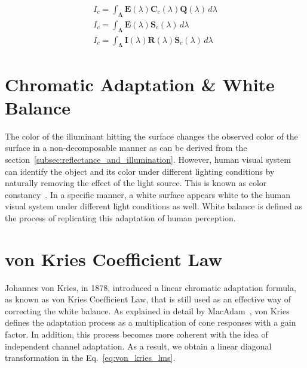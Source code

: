 \begin{subequations}
\label{eq:camera_model_formula}
\begin{align}
I_c = \int_{\mathbf{\Lambda}} \mathbf{E}(\lambda) \mathbf{C}_c(\lambda) \mathbf{Q}(\lambda) \, d\lambda \label{eq:camera_model_formula_separated} \\
I_c = \int_{\mathbf{\Lambda}} \mathbf{E}(\lambda) \mathbf{S}_c(\lambda) \, d\lambda \label{eq:camera_model_formula_sensor_sensitivity} \\
I_c = \int_{\mathbf{\Lambda}} \mathbf{I}(\lambda) \mathbf{R}(\lambda) \mathbf{S}_c(\lambda) \, d\lambda \label{eq:camera_model_formula_pixel}
\end{align}

\end{subequations}

\section{Chromatic Adaptation \& White Balance}
\label{sec:chromatic_adaptation_and_white_balance}

The color of the illuminant hitting the surface changes the observed color of the surface in a non-decomposable manner as can be derived from the section~\ref{subsec:reflectance_and_illumination}. However, human visual system can identify the object and its color under different lighting conditions by naturally removing the effect of the light source. This is known as color constancy~\cite{reinhard2008color}. In a specific manner, a white surface appears white to the human visual system under different light conditions as well. White balance is defined as the process of replicating this adaptation of human perception. 

\section{von Kries Coefficient Law}
\label{sec:von_kries_coefficient_law}

Johannes von Kries, in 1878, introduced a linear chromatic adaptation formula, as known as von Kries Coefficient Law, that is still used as an effective way of correcting the white balance. As explained in detail by MacAdam~\cite{MacAdamChromaticAdaptationVonKriesExplained1981}, von Kries defines the adaptation process as a multiplication of cone responses with a gain factor. In addition, this process becomes more coherent with the idea of independent channel adaptation. As a result, we obtain a linear diagonal transformation in the Eq.~\ref{eq:von_kries_lms}.

